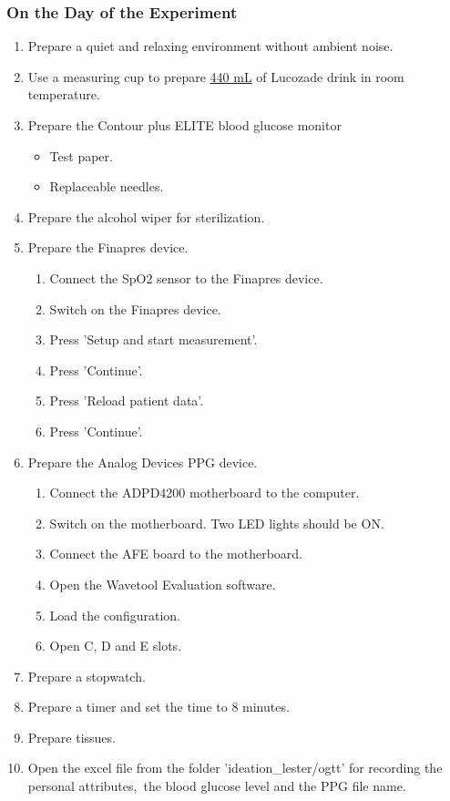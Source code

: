 \documentclass{article}
\begin{document}
\subsubsection{On the Day of the Experiment}
\begin{enumerate}
\item Prepare a quiet and relaxing environment without ambient noise.
\item Use a measuring cup to prepare \underline{440 mL} of Lucozade drink in room temperature.
\item Prepare the Contour plus ELITE blood glucose monitor
    \begin{itemize}
    \item Test paper.
    \item Replaceable needles.
    \end{itemize}
\item Prepare the alcohol wiper for sterilization.
\item Prepare the Finapres device.
    \begin{enumerate}
    \item Connect the SpO2 sensor to the Finapres device.
    \item Switch on the Finapres device.
    \item Press 'Setup and start measurement'.
    \item Press 'Continue'.
    \item Press 'Reload patient data'.
    \item Press 'Continue'.
    \end{enumerate}
\item Prepare the Analog Devices PPG device.
    \begin{enumerate}
    \item Connect the ADPD4200 motherboard to the computer.
    \item Switch on the motherboard. Two LED lights should be ON.
    \item Connect the AFE board to the motherboard.
    \item Open the Wavetool Evaluation software.
    \item Load the configuration.
    \item Open C, D and E slots.
    \end{enumerate}
\item Prepare a stopwatch.
\item Prepare a timer and set the time to 8 minutes.
\item Prepare tissues.
\item Open the excel file from the folder 'ideation\_lester/ogtt' for recording the personal attributes,\
the blood glucose level and the PPG file name.
\end{enumerate}
\end{document}
